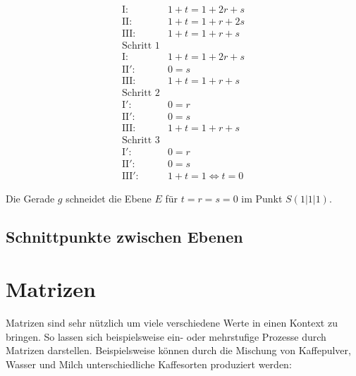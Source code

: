 \begin{flushleft}
\begin{align}
    \text{I}\colon& 1+t=1+2r+s \\
    \text{II}\colon& 1+t=1+r+2s \\
    \text{III}\colon& 1+t=1+r+s \\
    \text{Schritt 1}& \\
    \text{I}\colon& 1+t=1+2r+s \\
    \text{II}'\colon& 0=s \\
    \text{III}\colon& 1+t=1+r+s \\
    \text{Schritt 2}& \\
    \text{I}'\colon& 0=r \\
    \text{II}'\colon& 0=s \\
    \text{III}\colon& 1+t=1+r+s \\
    \text{Schritt 3}& \\
    \text{I}'\colon& 0=r \\
    \text{II}'\colon& 0=s \\
    \text{III}'\colon& 1+t=1 \Leftrightarrow t=0
\end{align}

Die Gerade $g$ schneidet die Ebene $E$ für $t=r=s=0$ im Punkt $S(1|1|1)$.
\end{flushleft}

\subsection{Schnittpunkte zwischen Ebenen}

\section{Matrizen}
\begin{flushleft}
Matrizen sind sehr nützlich um viele verschiedene Werte in einen Kontext zu bringen.
So lassen sich beispielsweise ein- oder mehrstufige Prozesse durch Matrizen darstellen.
Beispielsweise können durch die Mischung von Kaffepulver, Wasser und Milch unterschiedliche Kaffesorten produziert werden:
\end{flushleft}

\begin{center}
\end{center}

